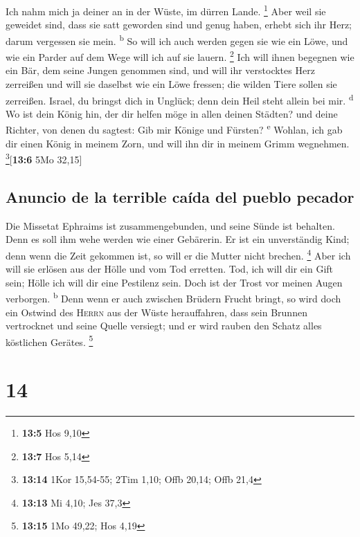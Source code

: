  Ich nahm mich ja deiner an in der Wüste, im dürren Lande.
\footnote{\textbf{13:5} Hos 9,10}  Aber weil sie geweidet
sind, dass sie satt geworden sind und genug haben, erhebt sich ihr Herz;
darum vergessen sie mein. \textsuperscript{b}  So will ich
auch werden gegen sie wie ein Löwe, und wie ein Parder auf dem Wege will
ich auf sie lauern. \footnote{\textbf{13:7} Hos 5,14}  Ich
will ihnen begegnen wie ein Bär, dem seine Jungen genommen sind, und
will ihr verstocktes Herz zerreißen und will sie daselbst wie ein Löwe
fressen; die wilden Tiere sollen sie zerreißen.  Israel,
du bringst dich in Unglück; denn dein Heil steht allein bei mir.
\textsuperscript{d}  Wo ist dein König hin, der dir
helfen möge in allen deinen Städten? und deine Richter, von denen du
sagtest: Gib mir Könige und Fürsten? \textsuperscript{e} 
Wohlan, ich gab dir einen König in meinem Zorn, und will ihn dir in
meinem Grimm wegnehmen. \footnote{\textbf{13:14} 1Kor 15,54-55; 2Tim
  1,10; Offb 20,14; Offb 21,4}{[}\textbf{13:6} 5Mo 32,15{]}

\hypertarget{anuncio-de-la-terrible-cauxedda-del-pueblo-pecador}{%
\subsection{Anuncio de la terrible caída del pueblo
pecador}\label{anuncio-de-la-terrible-cauxedda-del-pueblo-pecador}}

 Die Missetat Ephraims ist zusammengebunden, und seine
Sünde ist behalten.  Denn es soll ihm wehe werden wie
einer Gebärerin. Er ist ein unverständig Kind; denn wenn die Zeit
gekommen ist, so will er die Mutter nicht brechen. \footnote{\textbf{13:13}
  Mi 4,10; Jes 37,3}  Aber ich will sie erlösen aus der
Hölle und vom Tod erretten. Tod, ich will dir ein Gift sein; Hölle ich
will dir eine Pestilenz sein. Doch ist der Trost vor meinen Augen
verborgen. \textsuperscript{b}  Denn wenn er auch
zwischen Brüdern Frucht bringt, so wird doch ein Ostwind des
\textsc{Herrn} aus der Wüste herauffahren, dass sein Brunnen vertrocknet
und seine Quelle versiegt; und er wird rauben den Schatz alles
köstlichen Gerätes. \footnote{\textbf{13:15} 1Mo 49,22; Hos 4,19}

\hypertarget{section-13}{%
\section{14}\label{section-13}}


